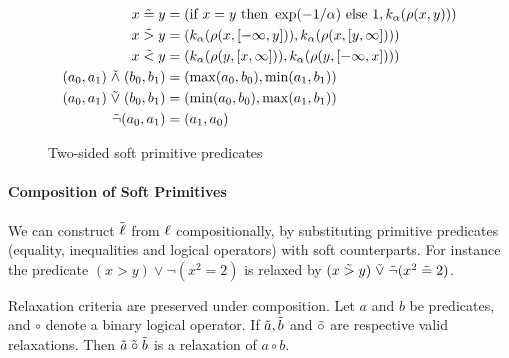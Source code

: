\begin{figure}
\begin{align*}
x \mathrel{\tilde{=}} y &= (\text{if } x = y  \text{ then } \exp(-1/\alpha) \text{ else } 1, k_\alpha(\rho(x, y)))\\
x \mathrel{\tilde{>}} y &= (k_\alpha(\rho(x, [-\infty, y])), k_\alpha(\rho(x, [y, \infty])))\\
x \mathrel{\tilde{<}} y &= (k_\alpha(\rho(y, [x, \infty])), k_\alpha(\rho(y, [-\infty, x])))\\
(a_0, a_1) \mathrel{\tilde{\land}} (b_0, b_1) &= (\max(a_0, b_0), \min(a_1, b_1))\\
(a_0, a_1) \mathrel{\tilde{\lor}} (b_0, b_1) &= (\min(a_0, b_0), \max(a_1, b_1))\\
\tilde{\neg}(a_0, a_1) &= (a_1, a_0)
\end{align*}
\caption{Two-sided soft primitive predicates}
\label{softw}
\end{figure}


\paragraph{Composition of Soft Primitives} We can construct $\mathrel{\tilde{\operatorname{\ell}}}$ from $\operatorname{\ell}$ compositionally, by substituting primitive predicates (equality, inequalities and logical operators) with soft counterparts.
For instance the predicate $(x > y) \lor \neg(x^2 = 2)$ is relaxed by $(x \mathrel{\tilde{>}} y) \mathrel{\tilde{\lor}} \tilde{\neg}(x^2 \mathrel{\tilde{=}} 2)$.

\begin{proposition}Relaxation criteria are preserved under composition.
Let $a$ and $b$ be predicates, and $\circ$ denote a binary logical operator.  If $\tilde{a}, \tilde{b}$ and $\mathrel{\tilde{\circ}}$ are respective valid relaxations.  Then $\tilde{a} \mathrel{\tilde{\circ}} \tilde{b}$ is a relaxation of $a \circ b$.
\end{proposition}



